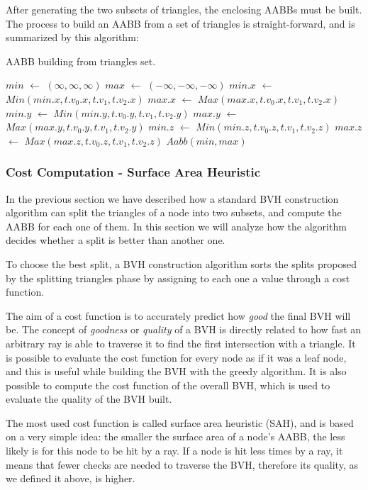 \documentclass{PoliMi_MasterThesis}
\newcommand*\Let[2]{\State #1 $\gets$ #2}
\begin{document}
After generating the two subsets of triangles, the enclosing AABBs must be built. The process to build an AABB from a set of triangles is straight-forward, and is summarized by this algorithm:
\begin{algorithm}[H]
	\caption{AABB building from triangles set.}
	\begin{algorithmic}[1]
		\Let{$min$}{$(\infty,\infty,\infty)$}
		\Let{$max$}{$(-\infty,-\infty,-\infty)$}
			\Let{$min.x$}{$Min(min.x, t.v_0.x, t.v_1, t.v_2.x)$}
			\Let{$max.x$}{$Max(max.x, t.v_0.x, t.v_1, t.v_2.x)$}
			\Let{$min.y$}{$Min(min.y, t.v_0.y, t.v_1, t.v_2.y)$}
			\Let{$max.y$}{$Max(max.y, t.v_0.y, t.v_1, t.v_2.y)$}
			\Let{$min.z$}{$Min(min.z, t.v_0.z, t.v_1, t.v_2.z)$}
			\Let{$max.z$}{$Max(max.z, t.v_0.z, t.v_1, t.v_2.z)$}
		\EndFor
		\State \Return $Aabb(min, max)$
		\EndFunction
	\end{algorithmic}
	\label{alg:aabb_creation}
\end{algorithm} 

\subsubsection{Cost Computation - Surface Area Heuristic} \label{ssec:cost_computation}
In the previous section we have described how a standard BVH construction algorithm can split the triangles of a node into two subsets, and compute the AABB for each one of them. In this section we will analyze how the algorithm decides whether a split is better than another one.

To choose the best split, a BVH construction algorithm sorts the splits proposed by the splitting triangles phase by assigning to each one a value through a cost function. 

The aim of a cost function is to accurately predict how \textit{good} the final BVH will be. The concept of \textit{goodness} or \textit{quality} of a BVH is directly related to how fast an arbitrary ray is able to traverse it to find the first intersection with a triangle. It is possible to evaluate the cost function for every node as if it was a leaf node, and this is useful while building the BVH with the greedy algorithm. It is also possible to compute the cost function of the overall BVH, which is used to evaluate the quality of the BVH built.

The most used cost function is called surface area heuristic (SAH), and is based on a very simple idea: the smaller the surface area of a node's AABB, the less likely is for this node to be hit by a ray. If a node is hit less times by a ray, it means that fewer checks are needed to traverse the BVH, therefore its quality, as we defined it above, is higher.
\end{document}
